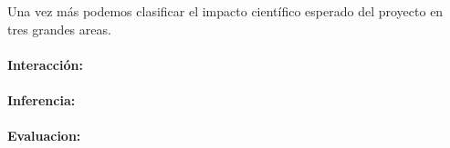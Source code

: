 
Una vez m\'as podemos clasificar el impacto cient\'ifico
esperado del proyecto en tres grandes areas.

\paragraph{Interacci\'on:}

\paragraph{Inferencia:}

\paragraph{Evaluacion:}
